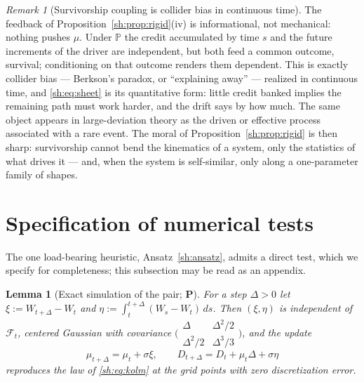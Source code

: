 \documentclass[11pt]{article}
\numberwithin{equation}{section}
\theoremstyle{plain}
\newtheorem{lemma}[theorem]{Lemma}
\theoremstyle{definition}
\theoremstyle{remark}
\newtheorem{remark}[theorem]{Remark}
\newcommand{\PP}{\mathbb{P}}
\newcommand{\Fc}{\mathcal{F}}
\begin{document}
\begin{remark}[Survivorship coupling is collider bias in continuous time]
\label{sh:rem:collider}
The feedback of Proposition~\ref{sh:prop:rigid}(iv) is informational, not
mechanical: nothing pushes $\mu$. Under $\PP$ the credit accumulated by
time $s$ and the future increments of the driver are independent, but
both feed a common outcome, survival; conditioning on that outcome
renders them dependent. This is exactly collider bias --- Berkson's
paradox, or ``explaining away'' --- realized in continuous time, and
\eqref{sh:eq:sheet} is its quantitative form: little credit banked
implies the remaining path must work harder, and the drift says by how
much. The same object appears in large-deviation theory as the driven or
effective process associated with a rare event. The moral of
Proposition~\ref{sh:prop:rigid} is then sharp: survivorship cannot bend
the kinematics of a system, only the statistics of what drives it ---
and, when the system is self-similar, only along a one-parameter family
of shapes.
\end{remark}

\section{Specification of numerical tests}\label{app:numerics}

\label{sh:sub:numerics}

The one load-bearing heuristic, Ansatz~\ref{sh:ansatz}, admits a direct
test, which we specify for completeness; this subsection may be read as an
appendix.

\begin{lemma}[Exact simulation of the pair; \textbf{P}]\label{sh:lem:exact}
For a step $\Delta>0$ let $\xi:=W_{t+\Delta}-W_t$ and
$\eta:=\int_t^{t+\Delta}(W_s-W_t)\,ds$. Then $(\xi,\eta)$ is independent of
$\Fc_t$, centered Gaussian with covariance
$\bigl(\begin{smallmatrix}\Delta&\Delta^2/2\\
\Delta^2/2&\Delta^3/3\end{smallmatrix}\bigr)$, and the update
\[
\mu_{t+\Delta}=\mu_t+\sigma\xi,\qquad
D_{t+\Delta}=D_t+\mu_t\Delta+\sigma\eta
\]
reproduces the law of \eqref{sh:eq:kolm} at the grid points with zero
discretization error.
\end{lemma}
\end{document}
